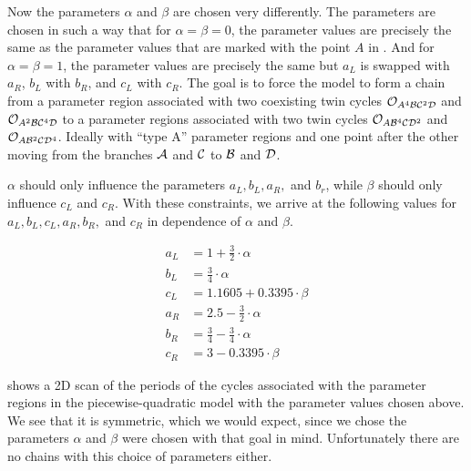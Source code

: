 Now the parameters $\alpha$ and $\beta$ are chosen very differently.
The parameters are chosen in such a way that for $\alpha = \beta = 0$, the parameter values are precisely the same as the parameter values that are marked with the point $A$ in .
And for $\alpha = \beta = 1$, the parameter values are precisely the same but $a_L$ is swapped with $a_R$, $b_L$ with $b_R$, and $c_L$ with $c_R$.
The goal is to force the model to form a chain from a parameter region associated with two coexisting twin cycles $\mathcal{O}_{A^4\mathcal{B}\mathcal{C}^2\mathcal{D}}$ and $\mathcal{O}_{A^2\mathcal{B}\mathcal{C}^4\mathcal{D}}$ to a parameter regions associated with two twin cycles $\mathcal{O}_{A\mathcal{B}^4\mathcal{C}\mathcal{D}^2}$ and $\mathcal{O}_{A\mathcal{B}^2\mathcal{C}\mathcal{D}^4}$.
Ideally with ``type A'' parameter regions and one point after the other moving from the branches $\mathcal{A}$ and $\mathcal{C}$ to $\mathcal{B}$ and $\mathcal{D}$.

$\alpha$ should only influence the parameters $a_L, b_L, a_R,$ and $b_r$, while $\beta$ should only influence $c_L$ and $c_R$.
With these constraints, we arrive at the following values for $a_L, b_L, c_L, a_R, b_R,$ and $c_R$ in dependence of $\alpha$ and $\beta$.

\begin{subequations}
	\begin{align}
		a_L & = 1 + \frac{3}{2} \cdot \alpha           \\
		b_L & = \frac{3}{4} \cdot \alpha               \\
		c_L & = 1.1605 + 0.3395 \cdot \beta            \\
		a_R & = 2.5 - \frac{3}{2} \cdot \alpha         \\
		b_R & = \frac{3}{4} - \frac{3}{4} \cdot \alpha \\
		c_R & = 3 - 0.3395 \cdot \beta
	\end{align}
\end{subequations}

 shows a 2D scan of the periods of the cycles associated with the parameter regions in the piecewise-quadratic model with the parameter values chosen above.
We see that it is symmetric, which we would expect, since we chose the parameters $\alpha$ and $\beta$ were chosen with that goal in mind.
Unfortunately there are no chains with this choice of parameters either.
